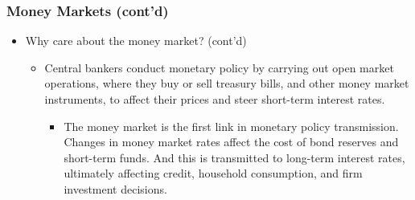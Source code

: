 \documentclass[10pt]{beamer}
\begin{document}
	
	\begin{frame}
		\frametitle{Money Markets (cont'd)}
		
		\begin{itemize}
			\item Why care about the money market? (cont'd)
			
			\begin{itemize}  \vspace{5pt} \itemsep10pt
				
				\item Central bankers conduct monetary policy by carrying out open market operations, where they buy or sell treasury bills, and other money market instruments, to affect their prices and steer short-term interest rates.
				\begin{itemize}  \vspace{5pt} \itemsep10pt
					\item The money market is the first link in monetary policy transmission. Changes in money market rates affect the cost of bond reserves and short-term funds. And this is transmitted to long-term interest rates, ultimately affecting credit, household consumption, and firm investment decisions.  
				\end{itemize}
			\end{itemize}
		\end{itemize}
		
	\end{frame}
	
	
	
\end{document}
